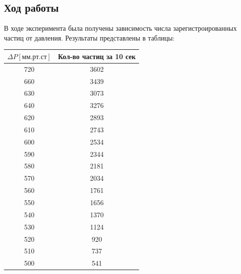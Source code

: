 \documentclass[a4paper,12pt]{article} %
\begin{document}
        \subsection{Ход работы}

            В ходе эксперимента была получены зависимость числа зарегистроированных частиц от давления. 
            Результаты представлены в таблицы:
            \begin{table}[h!]
                \centering
                \begin{tabular}{|c|c|}
                \hline
                $\Delta P [\text{мм.рт.ст}]$& Кол-во частиц за 10 сек \\ \hline
                720                 & 3602                    \\ \hline
                660                 & 3439                    \\ \hline
                630                 & 3073                    \\ \hline
                640                 & 3276                    \\ \hline
                620                 & 2893                    \\ \hline
                610                 & 2743                    \\ \hline
                600                 & 2534                    \\ \hline
                590                 & 2344                    \\ \hline
                580                 & 2181                    \\ \hline
                570                 & 2034                    \\ \hline
                560                 & 1761                    \\ \hline
                550                 & 1656                    \\ \hline
                540                 & 1370                    \\ \hline
                530                 & 1124                    \\ \hline
                520                 & 920                     \\ \hline
                510                 & 737                     \\ \hline
                500                 & 541                     \\ \hline

\end{tabular}
\end{table}
\end{document}
